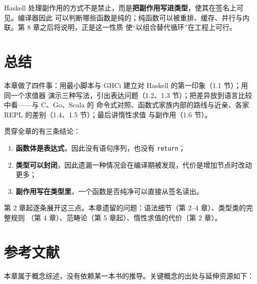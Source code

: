 Haskell 处理副作用的方式不是禁止，而是\textbf{把副作用写进类型}，使其在签名上可见。编译器因此
可以判断哪些函数是纯的；纯函数可以被重排、缓存、并行与内联。第 8 章之后将说明，正是这一性质
使“以组合替代循环”在工程上可行。

\section{总结}\label{ux603bux7ed3}

本章做了四件事：用最小脚本与 GHCi 建立对 Haskell 的第一印象（1.1 节）；用同一个求值器
演示三种写法，引出表达问题（1.2、1.3 节）；把差异放到语言比较中看------与 C、Go、Scala 的
命令式对照、函数式家族内部的路线与近亲、各家 REPL 的差别（1.4、1.5 节）；最后讲惰性求值
与副作用（1.6 节）。

贯穿全章的有三条结论：

\begin{enumerate}
\def\labelenumi{\arabic{enumi}.}
\tightlist
\item
  \textbf{函数体是表达式}，因此没有语句序列，也没有 \passthrough{\lstinline!return!}；
\item
  \textbf{类型可以封闭}，因此遗漏一种情况会在编译期被发现，代价是增加节点时改动更多；
\item
  \textbf{副作用写在类型里}，一个函数是否纯净可以直接从签名读出。
\end{enumerate}

第 2 章起逐条展开这三点。本章遗留的问题：语法细节（第 2--4 章）、类型类的完整规则
（第 4 章）、范畴论（第 5 章起）、惰性求值的代价（第 2 章）。

\section*{参考文献}
\label{ux53c2ux8003ux6587ux732e}

本章属于概念综述，没有依赖某一本书的推导。关键概念的出处与延伸资源如下：

